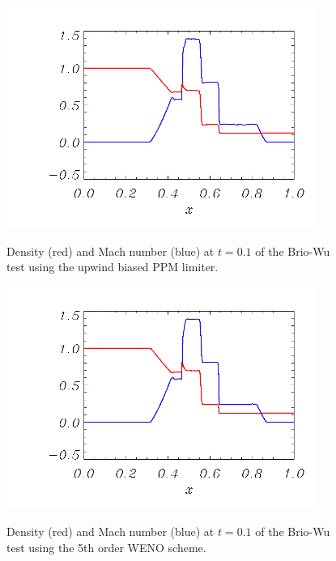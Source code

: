 \begin{figure}[!htbp]
\begin{center}
{\leavevmode\includegraphics[width=4in]{Lee_fig3}}
\end{center}
\caption{\label{fig:BrioWu_upwindPPM3} Density (red) and Mach number (blue) at $t=0.1$ of the Brio-Wu test  using the upwind biased PPM limiter.
}
\end{figure}

\begin{figure}[!htbp]
\begin{center}
{\leavevmode\includegraphics[width=4in]{Lee_fig4}}
\end{center}
\caption{\label{fig:BrioWu_upwindPPM4} Density (red) and Mach number (blue) at $t=0.1$ of the Brio-Wu test  using the 5th order WENO scheme.
}
\end{figure}

